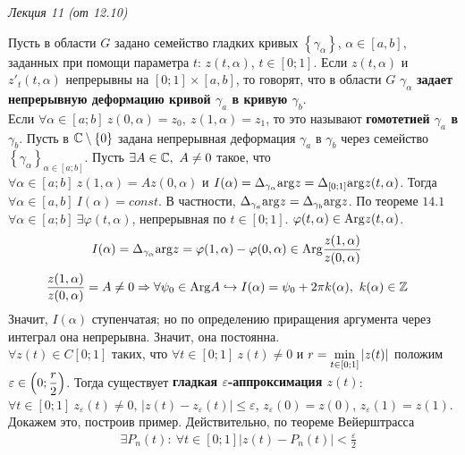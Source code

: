 \begin{flushright}
    \textit{Лекция 11 (от 12.10)}
\end{flushright}
\Def
Пусть в области $G$ задано семейство гладких кривых $\left\{ \gamma_\alpha
\right\}$, $\alpha \in [a,b]$, заданных при помощи параметра $t$: $z(t,
\alpha)$, $t \in [0;1]$. Если $z(t, \alpha)$ и $z'_t(t, \alpha)$ непрерывны на
$[0;1] \times [a,b]$, то говорят, что в области $G$ $\gamma_{\alpha}$
\textbf{задает непрерывную деформацию кривой $\gamma_a$ в кривую $\gamma_b$}.
\\
Если $\forall \alpha \in [a;b] \ z(0, \alpha) = z_0, \ z(1, \alpha) = z_1$, то
это называют \textbf{гомотетией $\gamma_a$ в $\gamma_b$}.
\theorem
Пусть в $\mathbb{C} \setminus \{0\}$ задана непрерывная деформация $\gamma_a$ в
$\gamma_b$ через семейство $\left\{ \gamma_\alpha \right\}_{\alpha \in [a;b]}$.
Пусть $\exists A \in \mathbb{C}, \ A \neq 0$ такое, что $\forall \alpha \in [a;b] \
z(1,\alpha) = Az(0, \alpha)$ и $I(\alpha) = \Delta_{\gamma_\alpha}\mathrm{arg} z =
\Delta_{[0;1]}\mathrm{arg} z(t, \alpha)$. Тогда $\forall \alpha \in [a,b] \ I(\alpha) =
const$. В частности, $\Delta_{\gamma_a}\mathrm{arg} z = \Delta_{\gamma_b}\mathrm{arg} z$.
\pr
По теореме $14.1$ $\forall \alpha \in [a;b] \ \exists \varphi(t, \alpha)$,
непрерывная по $t \in [0;1]$. $\varphi(t, \alpha) \in \mathrm{Arg} z (t, \alpha)$.
\begin{align*}
  & I(\alpha) = \Delta_{\gamma_\alpha}\mathrm{arg} z = \varphi(1, \alpha) - \varphi(0, \alpha) \in \mathrm{Arg} \frac{z(1, \alpha)}{z(0, \alpha)}
\end{align*}
\begin{align*}
  & \frac{z(1, \alpha)}{z(0, \alpha)} = A \neq 0 \Rightarrow \forall \psi_0 \in \Arg A \hookrightarrow I(\alpha) = \psi_0+2\pi k(\alpha), \ k(\alpha) \in \ZZ
\end{align*}
Значит, $I(\alpha)$ ступенчатая; но по определению приращения аргумента через
интеграл она непрерывна. Значит, она постоянна.
\\
$\forall z(t) \in C[0;1]$ таких, что $\forall t \in [0;1] \ z(t) \neq 0$ и $r =
\displaystyle \min_{t \in [0;1]} \left| z(t) \right|$ положим $\varepsilon\in \left( 0;
    \displaystyle \frac{r}{2} \right)$. Тогда существует \textbf{гладкая
  $\varepsilon$-аппроксимация $z(t)$}: $\forall t \in [0;1] \ z_\varepsilon(t)
\neq 0$, $\left| z(t) - z_\varepsilon(t) \right| \leq \varepsilon$,
$z_\varepsilon(0) = z(0)$, $z_\varepsilon(1) = z(1)$.
\\
Докажем это, построив пример. Действительно, по теореме Вейерштрасса
\begin{align*}
  & \exists P_n(t): \ \forall t \in [0;1] \left| z(t) - P_n(t) \right| < \frac{\varepsilon}{2}
\end{align*}
